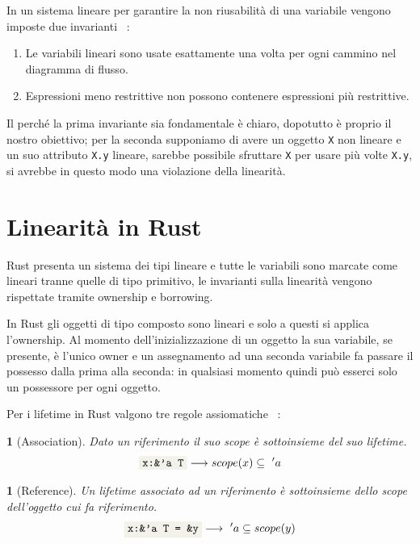 \documentclass[Lau,binding=0.6cm]{sapthesis}
\newtheorem{lemma}[theorem]{}
\newcommand{\textcode}[1]{\colorbox{backcolour}{\texttt{#1}}}
\begin{document}
In un sistema lineare per garantire la non riusabilità di una variabile vengono imposte due invarianti ~\cite{walker:linear_logic}:

\begin{enumerate}
    \item Le variabili lineari sono usate esattamente una volta per ogni cammino nel diagramma di flusso.
    \item Espressioni meno restrittive non possono contenere espressioni più restrittive. 
\end{enumerate}

Il perché la prima invariante sia fondamentale è chiaro, dopotutto è proprio il nostro obiettivo; per la seconda supponiamo di avere un oggetto \texttt{X} non lineare e un suo attributo \texttt{X.y} lineare, sarebbe possibile sfruttare \texttt{X} per usare più volte \texttt{X.y}, si avrebbe in questo modo una violazione della linearità. 

\section{Linearità in Rust} \label{sec:Rust_linear}

Rust presenta un sistema dei tipi lineare e tutte le variabili sono marcate come lineari tranne quelle di tipo primitivo, le invarianti sulla linearità vengono rispettate tramite ownership e borrowing.

In Rust gli oggetti di tipo composto sono lineari e solo a questi si applica l'ownership.
Al momento dell'inizializzazione di un oggetto la sua variabile, se presente, è l'unico owner e un assegnamento ad una seconda variabile fa passare il possesso dalla prima alla seconda: in qualsiasi momento quindi può esserci solo un possessore per ogni oggetto. 

Per i lifetime in Rust valgono tre regole assiomatiche ~\cite{mechpen:misundestand}:

\begin{lemma}[Association] \label{lemma:association}
    Dato un riferimento il suo scope è sottoinsieme del suo lifetime.
    \begin{equation*}
        \textnormal{\textcode{x:\&'a T}} \longrightarrow  scope(x) \subseteq \ 'a
    \end{equation*}
\end{lemma}

\begin{lemma}[Reference] \label{lemma:reference}
    Un lifetime associato ad un riferimento è sottoinsieme dello scope dell'oggetto cui fa riferimento. 
    \begin{equation*}
        \textnormal{\textcode{x:\&'a T = \&y}} \longrightarrow \ 'a \subseteq scope(y)
    \end{equation*}
\end{lemma}
\end{document}
